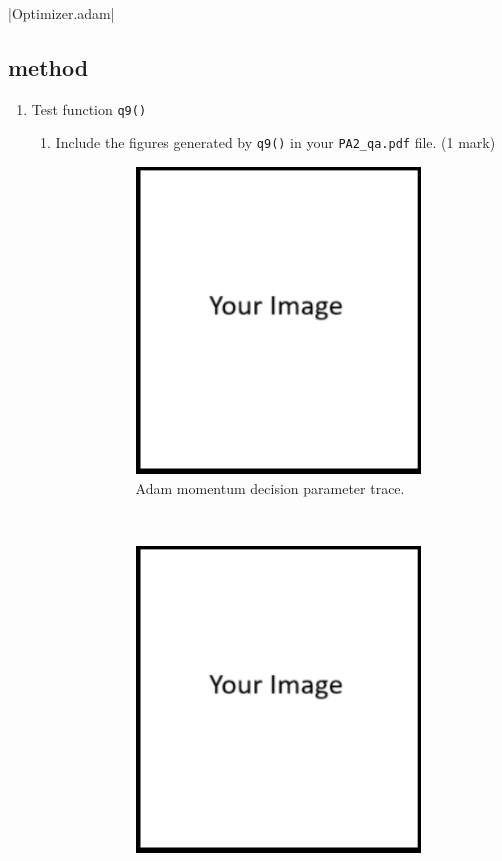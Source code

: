 \documentclass{article}
\theoremstyle{definition}
\begin{document}
\newpage
{}|Optimizer.adam|
\subsection{ method}\label{adam}
\begin{enumerate}[label=\ref{adam}.\alph*]
	\item Test function \verb|q9()|
	\begin{enumerate}[label=1.3.a.\roman*]
		\item Include the figures generated by \verb|q9()| in your \verb|PA2_qa.pdf| file. (1 mark)
		\begin{figure}[h]
			\centering
			\begin{subfigure}[t]{0.5\textwidth}
				\centering
				\includegraphics[height=3.2in]{image.png}
				\caption{Adam momentum decision parameter trace.}
			\end{subfigure}%
			~ 
			\begin{subfigure}[t]{0.5\textwidth}
				\centering
				\includegraphics[height=3.2in]{image.png}

\end{subfigure}
\end{figure}
\end{enumerate}
\end{enumerate}
\end{document}
